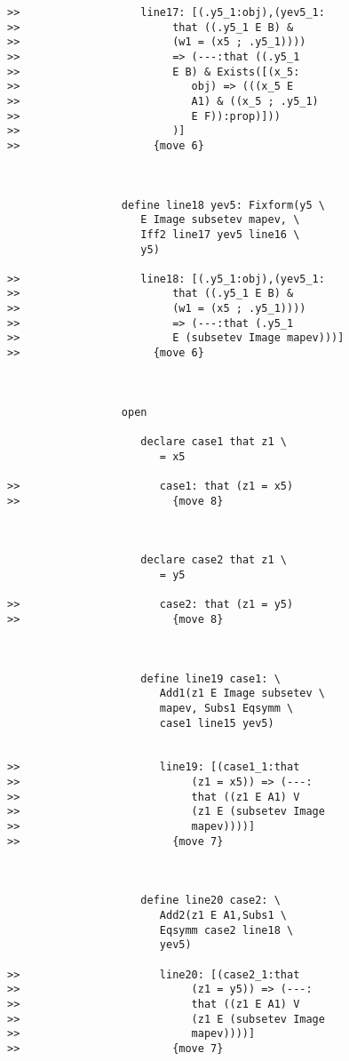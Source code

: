 \documentclass[12pt]{article}
\begin{document}
\begin{verbatim}
>>                   line17: [(.y5_1:obj),(yev5_1:
>>                        that ((.y5_1 E B) &
>>                        (w1 = (x5 ; .y5_1))))
>>                        => (---:that ((.y5_1
>>                        E B) & Exists([(x_5:
>>                           obj) => (((x_5 E
>>                           A1) & ((x_5 ; .y5_1)
>>                           E F)):prop)]))
>>                        )]
>>                     {move 6}



                  define line18 yev5: Fixform(y5 \
                     E Image subsetev mapev, \
                     Iff2 line17 yev5 line16 \
                     y5)

>>                   line18: [(.y5_1:obj),(yev5_1:
>>                        that ((.y5_1 E B) &
>>                        (w1 = (x5 ; .y5_1))))
>>                        => (---:that (.y5_1
>>                        E (subsetev Image mapev)))]
>>                     {move 6}



                  open

                     declare case1 that z1 \
                        = x5

>>                      case1: that (z1 = x5)
>>                        {move 8}



                     declare case2 that z1 \
                        = y5

>>                      case2: that (z1 = y5)
>>                        {move 8}



                     define line19 case1: \
                        Add1(z1 E Image subsetev \
                        mapev, Subs1 Eqsymm \
                        case1 line15 yev5)


>>                      line19: [(case1_1:that
>>                           (z1 = x5)) => (---:
>>                           that ((z1 E A1) V
>>                           (z1 E (subsetev Image
>>                           mapev))))]
>>                        {move 7}



                     define line20 case2: \
                        Add2(z1 E A1,Subs1 \
                        Eqsymm case2 line18 \
                        yev5)

>>                      line20: [(case2_1:that
>>                           (z1 = y5)) => (---:
>>                           that ((z1 E A1) V
>>                           (z1 E (subsetev Image
>>                           mapev))))]
>>                        {move 7}




\end{verbatim}
\end{document}
